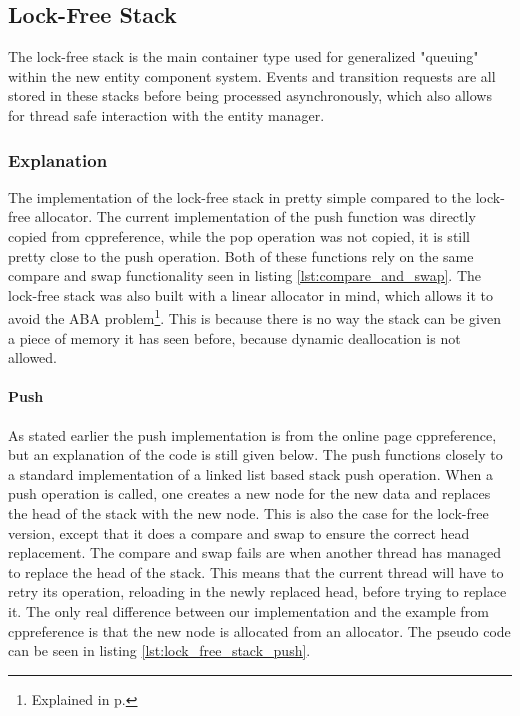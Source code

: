 \subsection{Lock-Free Stack}
\label{subsec:detailed_lock_free_stack}
The lock-free stack is the main container type used for generalized "queuing" within
the new entity component system. Events and transition requests are all stored
in these stacks before being processed asynchronously, which also
allows for thread safe interaction with the entity manager.

\subsubsection{Explanation}
The implementation of the lock-free stack in pretty simple compared to the lock-free allocator.
The current implementation of the push function was directly copied from cppreference\cite{cppreference_atomic_compare_exchange},
while the pop operation was not copied, it is still pretty close to the push operation.
Both of these functions rely on the same compare and swap functionality seen in listing \ref{lst:compare_and_swap}.
The lock-free stack was also built with a linear allocator in mind, which allows it to avoid the ABA problem\footnote{Explained in p.\pageref{subpar:detailed_lock_free_allocator_aba}}.
This is because there is no way the stack can be given a piece of memory it has seen before, because dynamic deallocation is not allowed.

\paragraph{Push}
As stated earlier the push implementation is from the online page cppreference\cite{cppreference_atomic_compare_exchange}, but an explanation of the code is still given below.
The push functions closely to a standard implementation of a linked list based stack push operation.
When a push operation is called, one creates a new node for the new data and replaces the head of the stack with the new node.
This is also the case for the lock-free version, except that it does a compare and swap
to ensure the correct head replacement.
The compare and swap fails are when another thread has managed to replace the head
of the stack. This means that the current thread will have to retry its operation, reloading in the newly replaced head, before trying to replace it.
The only real difference between our implementation and the example from cppreference is that the new node is allocated from an allocator.
The pseudo code can be seen in listing \ref{lst:lock_free_stack_push}.


